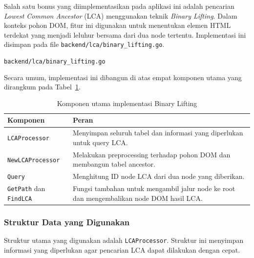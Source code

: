 Salah satu bonus yang diimplementasikan pada aplikasi ini adalah pencarian
\textit{Lowest Common Ancestor} (LCA) menggunakan teknik \textit{Binary Lifting}.
Dalam konteks pohon DOM, fitur ini digunakan untuk menentukan elemen HTML
terdekat yang menjadi leluhur bersama dari dua node tertentu. Implementasi ini
disimpan pada file \texttt{backend/lca/binary\_lifting.go}.

\begin{tcolorbox}[colback=gray!10,title=Lokasi File Implementasi Binary Lifting]
\texttt{backend/lca/binary\_lifting.go}
\end{tcolorbox}



Secara umum, implementasi ini dibangun di atas empat komponen utama yang dirangkum
pada Tabel~\ref{tab:komponen-binary-lifting}.

\begin{table}[H]
\centering
\caption{Komponen utama implementasi Binary Lifting}
\label{tab:komponen-binary-lifting}
\begin{tabular}{|l|p{9.5cm}|}
\hline
\textbf{Komponen} & \textbf{Peran} \\ \hline
\texttt{LCAProcessor} & Menyimpan seluruh tabel dan informasi yang diperlukan untuk query LCA. \\ \hline
\texttt{NewLCAProcessor} & Melakukan preprocessing terhadap pohon DOM dan membangun tabel ancestor. \\ \hline
\texttt{Query} & Menghitung ID node LCA dari dua node yang diberikan. \\ \hline
\texttt{GetPath} dan \texttt{FindLCA} & Fungsi tambahan untuk mengambil jalur node ke root dan mengembalikan node DOM hasil LCA. \\ \hline
\end{tabular}
\end{table}

\subsubsection{Struktur Data yang Digunakan}

Struktur utama yang digunakan adalah \texttt{LCAProcessor}. Struktur ini menyimpan
informasi yang diperlukan agar pencarian LCA dapat dilakukan dengan cepat.

